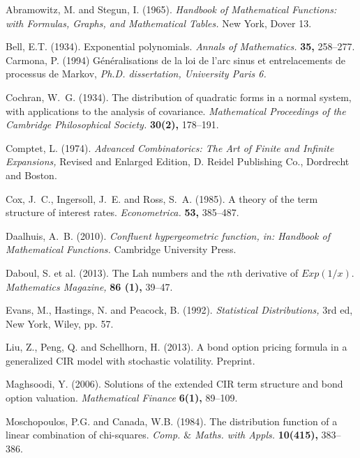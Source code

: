 \documentclass[6pt]{article}
\numberwithin{equation}{section}
\begin{document}
\begin{thebibliography}{99}
\footnotesize

{\sc Abramowitz, M. and Stegun, I.} (1965). {\em Handbook of Mathematical Functions: with Formulas, Graphs, and Mathematical Tables.} New York, Dover 13.

{\sc Bell, E.T.} (1934). Exponential polynomials. {\em Annals of Mathematics.} {\bf 35,} 258--277.
 {\sc Carmona, P.} (1994) G\'en\'eralisations de la loi de l'arc sinus et entrelacements de processus de
Markov, {\em Ph.D. dissertation, University Paris 6.}

{\sc Cochran, W.~G.} (1934). The distribution of quadratic forms in a normal
system, with applications to the analysis of covariance. {\em Mathematical
Proceedings of the Cambridge Philosophical Society.} {\bf 30(2),} 178--191.

{\sc Comptet, L.} (1974). \emph{Advanced Combinatorics: The Art of Finite and Infinite Expansions,} Revised and Enlarged Edition, D. Reidel Publishing Co., Dordrecht and Boston.

{\sc Cox, J.~C., Ingersoll, J.~E. and Ross, S.~A.} (1985).  A theory of the term
structure of interest rates. {\em Econometrica.}
{\bf 53,} 385--487.

{\sc Daalhuis, A.~B.} (2010).  {\em Confluent hypergeometric function, in: Handbook of Mathematical Functions.} Cambridge University Press.

{\sc Daboul, S. et al.} (2013).  The Lah numbers and the $n$th derivative of $Exp(1/x)$.   \emph{Mathematics Magazine,} \textbf{86 (1),} 39--47.


{\sc Evans, M., Hastings, N. and Peacock, B.} (1992). {\em Statistical Distributions,} 3rd ed, New York, Wiley, pp. 57.

{\sc Liu, Z., Peng, Q. and Schellhorn, H.} (2013).  A bond option pricing formula
in a generalized CIR model with stochastic volatility. Preprint.


{\sc Maghsoodi, Y.} (2006).  Solutions of the extended CIR term structure and
bond option valuation. {\em Mathematical Finance}
{\bf 6(1),} 89--109.

{\sc Moschopoulos, P.G. and Canada, W.B.} (1984).  The distribution function of a linear combination of chi-squares. {\em Comp. $\&$ Maths. with Appls.}
{\bf 10(415),} 383--386.


\end{thebibliography}
\end{document}
